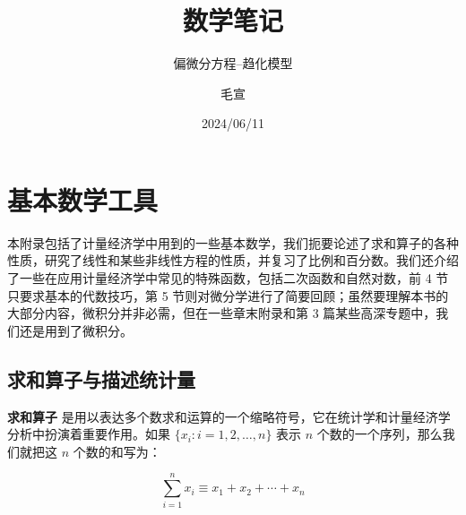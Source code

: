\documentclass[lang=cn,newtx,10pt,scheme=chinese,device=pad]{elegantbook}
\title{数学笔记}
\subtitle{偏微分方程--趋化模型}
\author{毛宣}
\institute{东南大学数学学院}
\date{2024/06/11}
\begin{document}
\maketitle
\frontmatter

\tableofcontents

\mainmatter















\printbibliography[heading=bibintoc, title=\ebibname]
\appendix

\chapter{基本数学工具}


本附录包括了计量经济学中用到的一些基本数学，我们扼要论述了求和算子的各种性质，研究了线性和某些非线性方程的性质，并复习了比例和百分数。我们还介绍了一些在应用计量经济学中常见的特殊函数，包括二次函数和自然对数，前 4 节只要求基本的代数技巧，第 5 节则对微分学进行了简要回顾；虽然要理解本书的大部分内容，微积分并非必需，但在一些章末附录和第 3 篇某些高深专题中，我们还是用到了微积分。

\section{求和算子与描述统计量}

\textbf{求和算子} 是用以表达多个数求和运算的一个缩略符号，它在统计学和计量经济学分析中扮演着重要作用。如果 $\{x_i: i=1, 2, \ldots, n\}$ 表示 $n$ 个数的一个序列，那么我们就把这 $n$ 个数的和写为：

\begin{equation}
\sum_{i=1}^n x_i \equiv x_1 + x_2 +\cdots + x_n
\end{equation}
\end{document}
